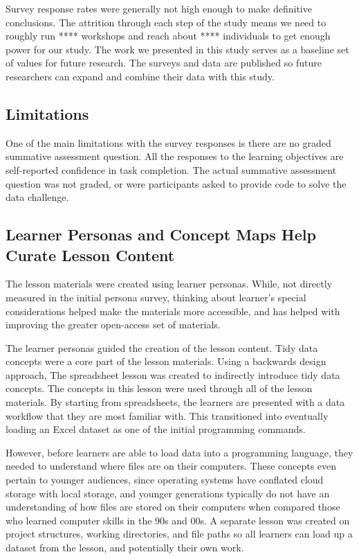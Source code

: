 \documentclass[030-workshop.tex]{subfiles}
\begin{document}
    Survey response rates were generally not high enough to make definitive conclusions.
    The attrition through each step of the study means we need to roughly run ****
    workshops and reach about **** individuals to get enough power for our study.
    The work we presented in this study serves as a baseline set of values for future research.
    The surveys and data are published so future researchers can expand and combine their
    data with this study.

    \subsection{Limitations}

        One of the main limitations with the survey responses is there
        are no graded summative assessment question.
        All the responses to the learning objectives are self-reported confidence in task completion.
        The actual summative assessment question was not graded,
        or were participants asked to provide code to solve the data challenge.

    \subsection{Learner Personas and Concept Maps Help Curate Lesson Content}

        The lesson materials were created using learner personas.
        While, not directly measured in the initial persona survey,
        thinking about learner's special considerations helped make the materials
        more accessible,
        and has helped with improving the greater open-access set of materials.

        The learner personas guided the creation of the lesson content.
        Tidy data concepts were a core part of the lesson materials.
        Using a backwards design approach,
        The spreadsheet lesson was created to indirectly introduce tidy data concepts.
        The concepts in this lesson were used through all of the lesson materials.
        By starting from spreadsheets,
        the learners are presented with a data workflow that they are most familiar with.
        This transitioned into eventually loading an Excel dataset as one of the initial programming commands.

        However, before learners are able to load data into a programming language,
        they needed to understand where files are on their computers.
        These concepts even pertain to younger audiences,
        since operating systems have conflated cloud storage with local storage,
        and younger generations typically do not have an understanding of how files are stored on their computers
        when compared those who learned computer skills in the 90s and 00s. %
        A separate lesson was created on project structures, working directories, and file paths
        so all learners can load up a dataset from the lesson, and potentially their own work.
\end{document}

